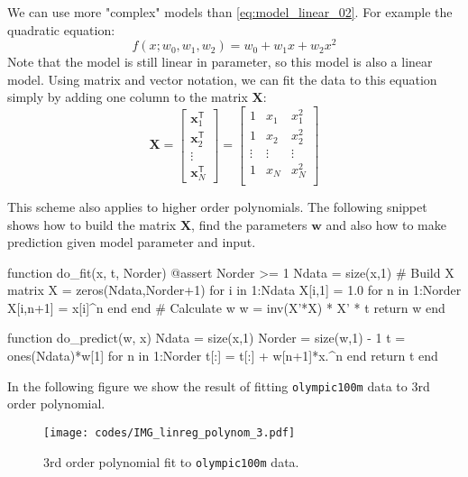 \documentclass[a4paper,11pt]{article} %
\newcommand{\txtinline}[1]{\texttt{#1}}
\begin{document}
We can use more "complex" models than \eqref{eq:model_linear_02}. For example
the quadratic equation:
\begin{equation}
f(x; w_{0}, w_{1}, w_{2}) = w_{0} +w_{1}x + w_{2}x^{2}
\label{eq:quadratic_eq}
\end{equation}
Note that the model is still linear in parameter, so this model is also a linear model.
Using matrix and vector notation, we can fit the data to this equation simply by
adding one column to the matrix $\mathbf{X}$:
\begin{equation}
\mathbf{X} = \begin{bmatrix}
\mathbf{x}^{\mathsf{T}}_{1} \\
\mathbf{x}^{\mathsf{T}}_{2} \\
\vdots \\
\mathbf{x}^{\mathsf{T}}_{N}
\end{bmatrix} =
\begin{bmatrix}
1 & x_{1} & x_{1}^{2} \\
1 & x_{2} & x_{2}^{2} \\
\vdots & \vdots & \vdots \\
1 & x_{N} & x_{N}^{2} \\
\end{bmatrix}
\end{equation}

This scheme also applies to higher order polynomials. The following snippet shows
how to build the matrix $\mathbf{X}$, find the parameters $\mathbf{w}$ and
also how to make prediction given model parameter and input.
\begin{juliacode}
function do_fit(x, t, Norder)
  @assert Norder >= 1
  Ndata = size(x,1)
  # Build X matrix
  X = zeros(Ndata,Norder+1)
  for i in 1:Ndata
    X[i,1] = 1.0
    for n in 1:Norder
      X[i,n+1] = x[i]^n
    end
  end
  # Calculate w
  w = inv(X'*X) * X' * t
  return w
end

function do_predict(w, x)
  Ndata = size(x,1)
  Norder = size(w,1) - 1
  t = ones(Ndata)*w[1]
  for n in 1:Norder
    t[:] = t[:] + w[n+1]*x.^n
  end
  return t
end
\end{juliacode}

In the following figure we show the result of fitting \txtinline{olympic100m} data
to 3rd order polynomial.
\begin{figure}[H]
\begin{center}
\texttt{[image: codes/IMG\_linreg\_polynom\_3.pdf]}
\end{center}
\caption{3rd order polynomial fit to \txtinline{olympic100m} data.}
\end{figure}
\end{document}
